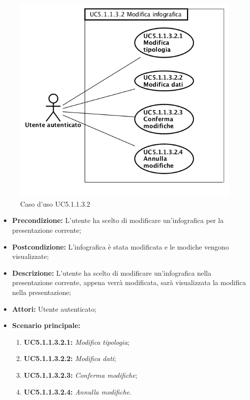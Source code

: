 \begin{figure}[h]
	\begin{center}
	\includegraphics[scale=0.4]{diagram/UC5-1-1-3-2.png}
	\caption{Caso d'uso UC5.1.1.3.2}
	\end{center}
\end{figure}
\begin{itemize}
	\item \textbf{Precondizione:} L'utente ha scelto di modificare un'infografica per la presentazione corrente;
	\item \textbf{Postcondizione:} L'infografica è stata modificata e le modiche vengono visualizzate;
	\item \textbf{Descrizione:} L'utente ha scelto di modificare un'infografica nella presentazione corrente, appena verrà modificata, sarà visualizzata la modifica nella presentazione;
	\item \textbf{Attori:} Utente autenticato;
	\item \textbf{Scenario principale:}
	\begin{enumerate}
		\item \textbf{ UC5.1.1.3.2.1:} \textit{ Modifica tipologia};
		\item \textbf{ UC5.1.1.3.2.2:} \textit{ Modifica dati};
		\item \textbf{ UC5.1.1.3.2.3:} \textit{ Conferma modifiche};
		\item \textbf{ UC5.1.1.3.2.4:} \textit{ Annulla modifiche}.
	\end{enumerate}
\end{itemize}
